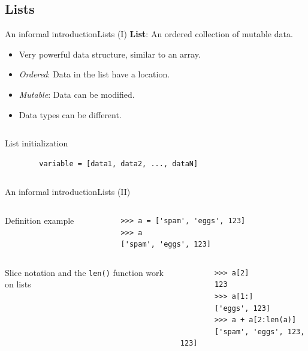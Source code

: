 \documentclass[10pt,compress]{beamer} %
\begin{document}
\subsection{Lists}
\begin{frame}[fragile]{An informal introduction}{Lists (I)}
	\textbf{List}: An ordered collection of mutable data.
	\begin{itemize}
		\item Very powerful data structure, similar to an array.
		\item \textit{Ordered}: Data in the list have a location.
		\item \textit{Mutable}: Data can be modified.
		\item Data types can be different.
	\end{itemize}
	\begin{columns}
		\begin{block}{List initialization}
		\begin{verbatim}
		variable = [data1, data2, ..., dataN]
		\end{verbatim}
		\end{block}
	\end{columns}
\end{frame}

\begin{frame}[fragile]{An informal introduction}{Lists (II)}
	\begin{columns}
 	   	\column{.40\textwidth}
		Definition example

   		\column{.60\textwidth}
		\begin{block}{}
		\begin{verbatim}
		>>> a = ['spam', 'eggs', 123]
		>>> a
		['spam', 'eggs', 123]
		\end{verbatim}
		\end{block}
	\end{columns}

	\begin{columns}
		Slice notation and the \texttt{len()} function work on lists

		\begin{block}{}
		\begin{verbatim}
		>>> a[2]
		123
		>>> a[1:]
		['eggs', 123]
		>>> a + a[2:len(a)]
		['spam', 'eggs', 123, 123]
		\end{verbatim}
		\end{block}
	\end{columns}
\end{frame}
\end{document}
